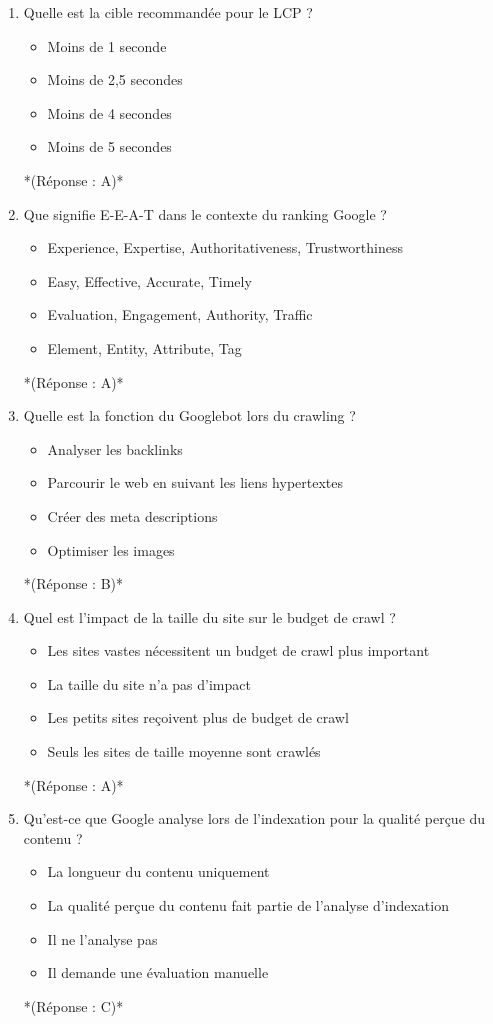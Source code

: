 \documentclass[12pt,a4paper,twoside]{report}
\begin{document}
\begin{enumerate}
\item Quelle est la cible recommandée pour le LCP ?
\begin{itemize}
\item[A)] Moins de 1 seconde
\item[B)] Moins de 2,5 secondes
\item[C)] Moins de 4 secondes
\item[D)] Moins de 5 secondes
\end{itemize}
*(Réponse : A)*

\item Que signifie E-E-A-T dans le contexte du ranking Google ?
\begin{itemize}
\item[A)] Experience, Expertise, Authoritativeness, Trustworthiness
\item[B)] Easy, Effective, Accurate, Timely
\item[C)] Evaluation, Engagement, Authority, Traffic
\item[D)] Element, Entity, Attribute, Tag
\end{itemize}
*(Réponse : A)*

\item Quelle est la fonction du Googlebot lors du crawling ?
\begin{itemize}
\item[A)] Analyser les backlinks
\item[B)] Parcourir le web en suivant les liens hypertextes
\item[C)] Créer des meta descriptions
\item[D)] Optimiser les images
\end{itemize}
*(Réponse : B)*

\item Quel est l'impact de la taille du site sur le budget de crawl ?
\begin{itemize}
\item[A)] Les sites vastes nécessitent un budget de crawl plus important
\item[B)] La taille du site n'a pas d'impact
\item[C)] Les petits sites reçoivent plus de budget de crawl
\item[D)] Seuls les sites de taille moyenne sont crawlés
\end{itemize}
*(Réponse : A)*

\item Qu'est-ce que Google analyse lors de l'indexation pour la qualité perçue du contenu ?
\begin{itemize}
\item[A)] La longueur du contenu uniquement
\item[B)] La qualité perçue du contenu fait partie de l'analyse d'indexation
\item[C)] Il ne l'analyse pas
\item[D)] Il demande une évaluation manuelle
\end{itemize}
*(Réponse : C)*


\end{enumerate}
\end{document}
